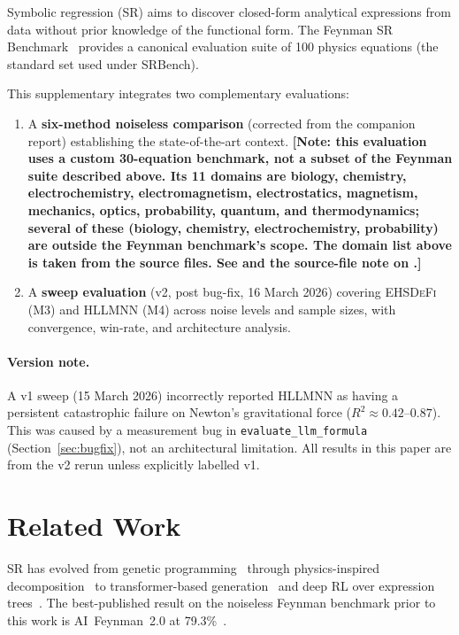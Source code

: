 \documentclass[twoside,11pt]{article}
\newcommand{\EHD}{\textsc{EHSDeFi}}
\newcommand{\HSL}{\textsc{HLLMNN}}
\newcommand{\Rsq}{R^{2}}
\begin{document}
Symbolic regression (SR) aims to discover closed-form analytical expressions
from data without prior knowledge of the functional form.  The Feynman SR
Benchmark~\citep{udrescu2020ai} provides a canonical evaluation suite of
100 physics equations (the standard set used under SRBench).

This supplementary integrates two complementary evaluations:
\begin{enumerate}
  \item A \textbf{six-method noiseless comparison} (corrected from the
    companion report) establishing the state-of-the-art context. \textbf{[Note:
    this evaluation uses a custom 30-equation benchmark, not a subset of the
    Feynman suite described above. Its 11 domains are biology, chemistry,
    electrochemistry, electromagnetism, electrostatics, magnetism, mechanics,
    optics, probability, quantum, and thermodynamics; several of these
    (biology, chemistry, electrochemistry, probability) are outside the
    Feynman benchmark's scope.  The domain list above is taken from the source files. See
     and the source-file note on .]}
  \item A \textbf{sweep evaluation} (v2, post bug-fix, 16 March 2026)
    covering \EHD{} (M3) and \HSL{} (M4) across noise levels and sample
    sizes, with convergence, win-rate, and architecture analysis.
\end{enumerate}

\paragraph{Version note.}
A v1 sweep (15 March 2026) incorrectly reported \HSL{} as having a persistent
catastrophic failure on Newton's gravitational force ($\Rsq \approx 0.42$--$0.87$).
This was caused by a measurement bug in \texttt{evaluate\_llm\_formula}
(Section~\ref{sec:bugfix}), not an architectural limitation.  All results in
this paper are from the v2 rerun unless explicitly labelled v1.

\section{Related Work}
\label{suppb:related}

SR has evolved from genetic programming~\citep{schmidt2009distilling} through
physics-inspired decomposition~\citep{udrescu2020ai} to transformer-based
generation~\citep{biggio2021neural,shojaee2023transformer} and deep RL over
expression trees~\citep{petersen2021deep}.  The best-published result on the
noiseless Feynman benchmark prior to this work is AI~Feynman~2.0 at
79.3\%~\citep{udrescu2020aifeynman2}.
\end{document}
